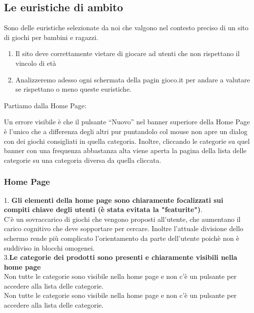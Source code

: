 \documentclass[../Report.tex]{subfiles}
\begin{document}
    \subsection{Le euristiche di ambito}
    Sono delle euristiche selezionate da noi che valgono nel contesto preciso di un sito di giochi per bambini e ragazzi.
    \begin{enumerate}
        \item Il sito deve correttamente vietare di giocare ad utenti che non rispettano il vincolo di età
        \item Analizzeremo adesso ogni schermata della pagin gioco.it per andare a valutare se rispettano o meno queste euristiche.
    \end{enumerate}

    Partiamo dalla Home Page:


    Un errore visibile è che il pulsante “Nuovo” nel banner superiore della Home Page è l’unico che a differenza degli altri pur puntandolo col mouse non apre un dialog con dei giochi consigliati in quella categoria. Inoltre, cliccando le categorie su quel banner con una frequenza abbastanza alta viene aperta la pagina della lista delle categorie su una categoria diversa da quella cliccata.

    \subsubsection{Home Page}
    
        1. \textbf{ Gli elementi della home page sono chiaramente focalizzati sui compiti chiave degli utenti (è stata evitata la "featurite")}.\\
        C’è un sovraccarico di giochi che vengono proposti all’utente, che aumentano il carico cognitivo che deve sopportare per cercare. Inoltre l’attuale divisione dello schermo rende più complicato l’orientamento da parte dell’utente poichè non è suddiviso in blocchi omogenei.\\

        3.\textbf{Le categorie dei prodotti sono presenti e chiaramente visibili nella home page}\\
        Non tutte le categorie sono visibile nella home page e non c’è un pulsante per accedere alla lista delle categorie.
\\ Non tutte le categorie sono visibile nella home page e non c’è un pulsante per accedere alla lista delle categorie.    
    
\end{document}

